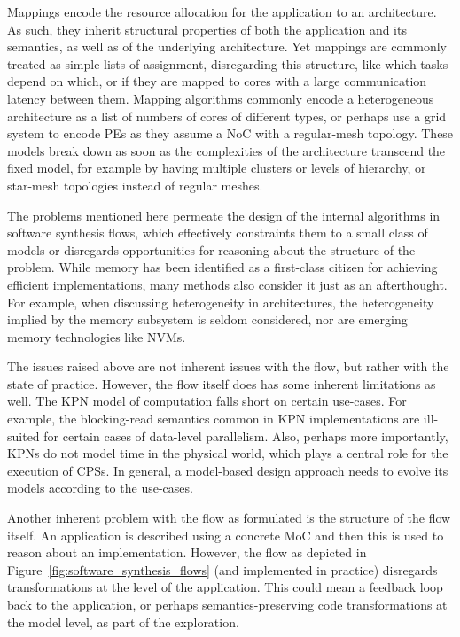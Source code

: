 Mappings encode the resource allocation for the application to an architecture.
As such, they inherit structural properties of both the application and its semantics, as well as of the underlying architecture.
Yet mappings are commonly treated as simple lists of assignment, disregarding this structure, like which tasks depend on which, or if they are mapped to cores with a large communication latency between them.
Mapping algorithms commonly encode a heterogeneous architecture as a list of numbers of cores of different types, or perhaps use a grid system to encode \acp{PE} as they assume a \ac{NoC} with a regular-mesh topology.
These models break down as soon as the complexities of the architecture transcend the fixed model, for example by having multiple clusters or levels of hierarchy, or star-mesh topologies instead of regular meshes.

The problems mentioned here permeate the design of the internal algorithms in software synthesis flows, which effectively constraints them to a small class of models or disregards opportunities for reasoning about the structure of the problem. 
While memory has been identified as a first-class citizen for achieving efficient implementations, many methods also consider it just as an afterthought.
For example, when discussing heterogeneity in architectures, the heterogeneity implied by the memory subsystem is seldom considered, nor are emerging memory technologies like \acp{NVM}.

The issues raised above are not inherent issues with the flow, but rather with the state of practice.
However, the flow itself does has some inherent limitations as well.
The \ac{KPN} model of computation falls short on certain use-cases.
For example, the blocking-read semantics common in \ac{KPN} implementations are ill-suited for certain cases of data-level parallelism.
Also, perhaps more importantly, \acp{KPN} do not model time in the physical world, which plays a central role for the execution of \acp{CPS}.
In general, a model-based design approach needs to evolve its models according to the use-cases.

Another inherent problem with the flow as formulated is the structure of the flow itself.
An application is described using a concrete \ac{MoC} and then this is used to reason about an implementation.
However, the flow as depicted in Figure~\ref{fig:software_synthesis_flows} (and implemented in practice) disregards transformations at the level of the application.
This could mean a feedback loop back to the application, or perhaps semantics-preserving code transformations at the model level, as part of the exploration.

